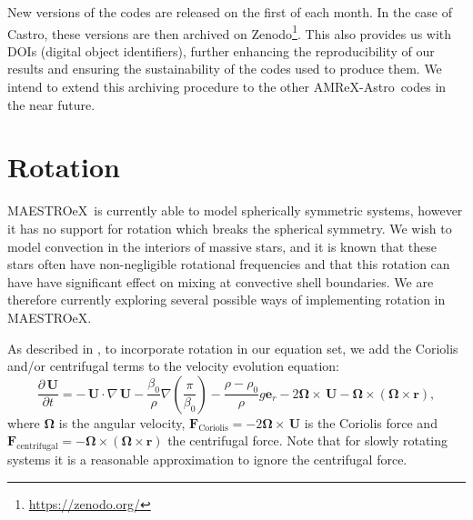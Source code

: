 \documentclass[a4paper]{jpconf}
\newcommand{\maestro}{{\sffamily Maestro}}
\newcommand{\maestroex}{{\sffamily MAESTROeX}}
\newcommand{\castro}{{\sffamily Castro}}
\newcommand{\amrexastro}{{\sffamily AMReX-Astro}}
\newcommand{\Ub}{{\,\bm{U}}}
\newcommand{\pd}[2]{\frac{\partial #1}{\partial #2}}
\newcommand{\MarginPar}[1]{\marginpar{\vskip-\baselineskip\raggedright\tiny\sffamily\hrule\smallskip{\color{red}#1}\par\smallskip\hrule}}
\begin{document}
New versions of the codes are released on the first of each month. In the case of \castro, these versions are then archived on Zenodo\footnote{\url{https://zenodo.org/}}. This also provides us with DOIs (digital object identifiers), further enhancing the reproducibility of our results and ensuring the sustainability of the codes used to produce them. We intend to extend this archiving procedure to the other \amrexastro~codes in the near future.


\section{Rotation} \label{sec:rotation}

\maestroex~is currently able to model spherically symmetric systems, however it has no support for rotation which breaks the spherical symmetry. We wish to model convection in the interiors of massive stars, and it is known that these stars often have non-negligible rotational frequencies and that this rotation can have have significant effect on mixing at convective shell boundaries. We are therefore currently exploring several possible ways of implementing rotation in \maestroex. 

As described in \cite{Zingale2011}, to incorporate rotation in our equation set, we add the Coriolis and/or centrifugal terms to the velocity evolution equation:
\begin{equation}
    \pd{\Ub}{t} = -\Ub\cdot\nabla\Ub - \frac{\beta_0}{\rho}\nabla\left(\frac{\pi}{\beta_0}\right) - \frac{\rho - \rho_0}{\rho} g \bm{e}_r - 2\boldsymbol{\Omega} \times \Ub - \boldsymbol{\Omega} \times (\boldsymbol{\Omega} \times \bm{r}),
\end{equation}
where $\boldsymbol{\Omega}$ is the angular velocity, $\bm{F}_\text{Coriolis}=- 2\boldsymbol{\Omega} \times \Ub$ is the Coriolis force and $\bm{F}_\text{centrifugal}= - \boldsymbol{\Omega} \times (\boldsymbol{\Omega} \times \bm{r})$ the centrifugal force.  Note that for slowly rotating systems it is a reasonable approximation to ignore the centrifugal force.

\end{document}
